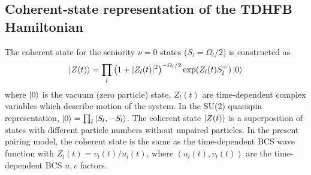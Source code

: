 \documentclass[%
superscriptaddress,
preprint,
showpacs,
nofootinbib,
amsmath,amssymb,
prc,
floatfix ]%
{revtex4-1}
\begin{document}
\subsection{Coherent-state representation of the TDHFB Hamiltonian}

The coherent state for the seniority $\nu=0$ states
($S_l=\Omega_l/2$) is constructed as
\begin{equation}
	\ket{Z(t)} = \prod_{l} \left(1+|Z_l(t)|^2\right)^{-\Omega_l/2}
	\exp (Z_l(t) S_l^{+}) \ket{0}
 \label{coherent}
\end{equation}
where $\ket{0}$ is the vacuum (zero particle) state,
$Z_l(t)$ are time-dependent complex variables which describe
motion of the system. 
In the SU(2) quasispin representation,
$\ket{0}=\prod_l \ket{S_l,-S_l}$.
The coherent state $\ket{Z(t)}$ is a superposition of
states with different particle numbers
without unpaired particles.
In the present pairing model,
the coherent state is the same as the time-dependent BCS wave function
with $Z_l(t)=v_l(t)/u_l(t)$,
where $(u_l(t),v_l(t))$ are the time-dependent BCS $u,v$ factors.
\end{document}

